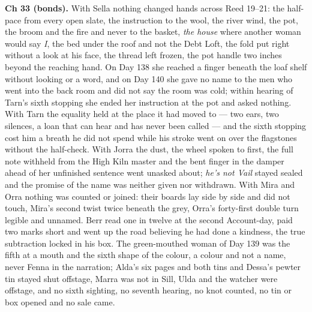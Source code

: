 \documentclass{design/chronicle}
\begin{document}
{\textbf{Ch 33 (bonds).} With Sella nothing changed hands across Reed 19–21: the half-pace from every open slate, the instruction to the wool, the river wind, the pot, the broom and the fire and never to the basket, \emph{the house} where another woman would say \emph{I}, the bed under the roof and not the Debt Loft, the fold put right without a look at his face, the thread left frozen, the pot handle two inches beyond the reaching hand. On Day 138 she reached a finger beneath the loaf shelf without looking or a word, and on Day 140 she gave no name to the men who went into the back room and did not say the room was cold; within hearing of Tarn’s sixth stopping she ended her instruction at the pot and asked nothing. With Tarn the equality held at the place it had moved to --- two ears, two silences, a loan that can hear and has never been called --- and the sixth stopping cost him a breath he did not spend while his stroke went on over the flagstones without the half-check. With Jorra the dust, the wheel spoken to first, the full note withheld from the High Kiln master and the bent finger in the damper ahead of her unfinished sentence went unasked about; \emph{he’s not Vail} stayed sealed and the promise of the name was neither given nor withdrawn. With Mira and Orra nothing was counted or joined: their boards lay side by side and did not touch, Mira’s second twist twice beneath the grey, Orra’s forty-first double turn legible and unnamed. Berr read one in twelve at the second Account-day, paid two marks short and went up the road believing he had done a kindness, the true subtraction locked in his box. The green-mouthed woman of Day 139 was the fifth at a mouth and the sixth shape of the colour, a colour and not a name, never Fenna in the narration; Alda’s six pages and both tins and Dessa’s pewter tin stayed shut offstage, Marra was not in Sill, Ulda and the watcher were offstage, and no sixth sighting, no seventh hearing, no knot counted, no tin or box opened and no sale came.

}
\end{document}
